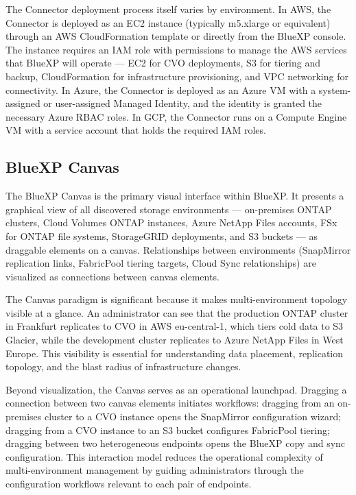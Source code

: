 The Connector deployment process itself varies by environment. In AWS, the
Connector is deployed as an EC2 instance (typically m5.xlarge or equivalent)
through an AWS CloudFormation template or directly from the BlueXP console.
The instance requires an IAM role with permissions to manage the AWS services
that BlueXP will operate --- EC2 for CVO deployments, S3 for tiering and
backup, CloudFormation for infrastructure provisioning, and VPC networking for
connectivity. In Azure, the Connector is deployed as an Azure VM with a
system-assigned or user-assigned Managed Identity, and the identity is granted
the necessary Azure RBAC roles. In GCP, the Connector runs on a Compute
Engine VM with a service account that holds the required IAM roles.

\subsection{BlueXP Canvas}

The BlueXP Canvas is the primary visual interface within BlueXP. It presents
a graphical view of all discovered storage environments --- on-premises ONTAP
clusters, Cloud Volumes ONTAP instances, Azure NetApp Files accounts, FSx for
ONTAP file systems, StorageGRID deployments, and S3 buckets --- as draggable
elements on a canvas. Relationships between environments (SnapMirror
replication links, FabricPool tiering targets, Cloud Sync relationships) are
visualized as connections between canvas elements.

The Canvas paradigm is significant because it makes multi-environment topology
visible at a glance. An administrator can see that the production ONTAP
cluster in Frankfurt replicates to CVO in AWS eu-central-1, which tiers cold
data to S3 Glacier, while the development cluster replicates to Azure NetApp
Files in West Europe. This visibility is essential for understanding data
placement, replication topology, and the blast radius of infrastructure
changes.

Beyond visualization, the Canvas serves as an operational launchpad. Dragging
a connection between two canvas elements initiates workflows: dragging from an
on-premises cluster to a CVO instance opens the SnapMirror configuration
wizard; dragging from a CVO instance to an S3 bucket configures FabricPool
tiering; dragging between two heterogeneous endpoints opens the BlueXP copy
and sync configuration. This interaction model reduces the operational
complexity of multi-environment management by guiding administrators through
the configuration workflows relevant to each pair of endpoints.

